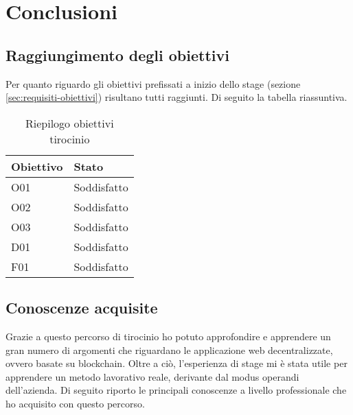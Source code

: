 
\chapter{Conclusioni}
\label{cap:conclusioni}

\section{Raggiungimento degli obiettivi}
Per quanto riguardo gli obiettivi prefissati a inizio dello stage (sezione \ref{sec:requisiti-obiettivi}) risultano tutti raggiunti. Di seguito la tabella riassuntiva.

\begin{longtable}[c]{|p{3cm} p{3cm}|}
\caption{Riepilogo obiettivi tirocinio}
\label{tab:obiettivi-tirocinio}
\\ \hline
\rowcolor{gray!40}
\textbf{Obiettivo} &
\textbf{Stato} \\ \hline
\endhead

O01 & Soddisfatto \\ \hline

O02 & Soddisfatto \\ \hline

O03 & Soddisfatto \\ \hline

D01 & Soddisfatto \\ \hline

F01 & Soddisfatto \\ \hline

\end{longtable}

\section{Conoscenze acquisite}
Grazie a questo percorso di tirocinio ho potuto approfondire e apprendere un gran numero di argomenti che riguardano le applicazione web decentralizzate, ovvero basate su blockchain. Oltre a ciò, l'esperienza di stage mi è stata utile per apprendere un metodo lavorativo reale, derivante dal modus operandi dell'azienda. Di seguito riporto le principali conoscenze a livello professionale che ho acquisito con questo percorso.

